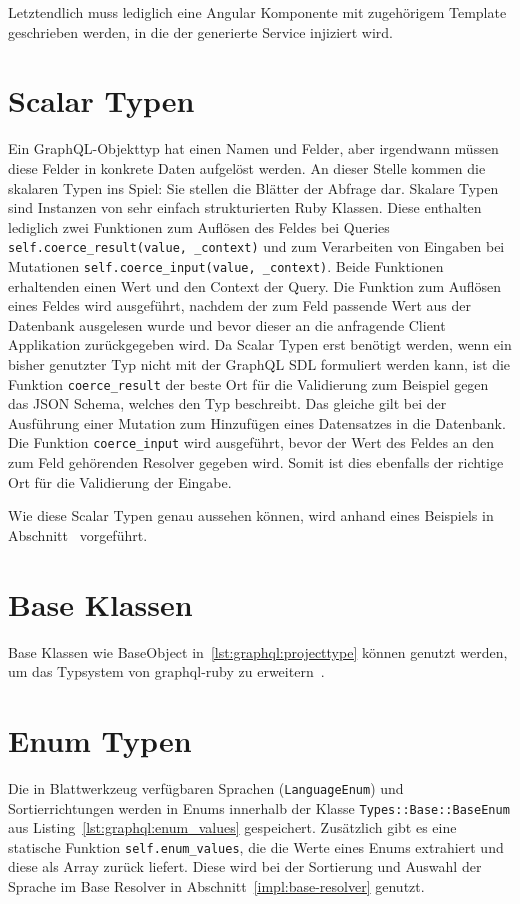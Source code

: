 Letztendlich muss lediglich eine Angular Komponente mit zugehörigem Template geschrieben werden, in die der generierte Service injiziert wird.

\section{Scalar Typen}
\label{graphql:scalartypes}
Ein GraphQL-Objekttyp hat einen Namen und Felder, aber irgendwann müssen diese Felder in konkrete Daten aufgelöst werden. An dieser Stelle kommen die skalaren Typen ins Spiel: Sie stellen die Blätter der Abfrage dar. 
Skalare Typen sind Instanzen von sehr einfach strukturierten Ruby Klassen. Diese enthalten lediglich zwei Funktionen zum Auflösen des Feldes bei Queries \texttt{self.coerce\_result(value, \_context)} und zum Verarbeiten von Eingaben bei Mutationen \texttt{self.coerce\_input(value, \_context)}. Beide Funktionen erhaltenden einen Wert und den Context der Query. Die Funktion zum Auflösen eines Feldes wird ausgeführt, nachdem der zum Feld passende Wert aus der Datenbank ausgelesen wurde und bevor dieser an die anfragende Client Applikation zurückgegeben wird. Da Scalar Typen erst benötigt werden, wenn ein bisher genutzter Typ nicht mit der GraphQL SDL formuliert werden kann, ist die Funktion \texttt{coerce\_result} der beste Ort für die Validierung zum Beispiel gegen das JSON Schema, welches den Typ beschreibt. Das gleiche gilt bei der Ausführung einer Mutation zum Hinzufügen eines Datensatzes in die Datenbank. Die Funktion \texttt{coerce\_input} wird ausgeführt, bevor der Wert des Feldes an den zum Feld gehörenden Resolver gegeben wird. Somit ist dies ebenfalls der richtige Ort für die Validierung der Eingabe.

Wie diese Scalar Typen genau aussehen können, wird anhand eines Beispiels in Abschnitt~ vorgeführt.

\section{Base Klassen}
\label{graphql:baseclass}
Base Klassen wie BaseObject in~\ref{lst:graphql:projecttype} können genutzt werden, um das Typsystem von graphql-ruby zu erweitern~\cite{graphql-extending}. 

\section{Enum Typen}
\label{graphql:enumtypes}
Die in Blattwerkzeug verfügbaren Sprachen (\texttt{LanguageEnum}) und Sortierrichtungen werden in Enums innerhalb der Klasse \texttt{Types::Base::BaseEnum} aus Listing~\ref{lst:graphql:enum_values} gespeichert. Zusätzlich gibt es eine statische Funktion \texttt{self.enum\_values}, die die Werte eines Enums extrahiert und diese als Array zurück liefert. Diese wird bei der Sortierung und Auswahl der Sprache im Base Resolver in Abschnitt~\ref{impl:base-resolver} genutzt.

